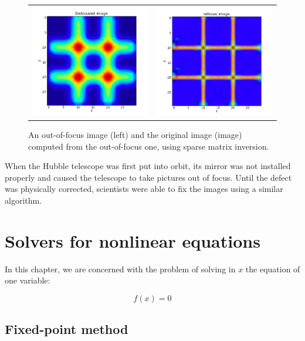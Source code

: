 \documentclass[justified,sixbynine]{tufte-book}
\theoremstyle{plain}%
\theoremstyle{definition}
\theoremstyle{remark}
\begin{document}
\begin{fullwidth}
\begin{figure}[ht]
\centering
\begin{tabular}{cc}
\includegraphics[width=2.2in]{images/defocused.png} &
\includegraphics[width=2.2in]{images/refocused.png}
\end{tabular}
\caption{An out-of-focus image (left) and the original image (image) computed from the out-of-focus one, using sparse matrix inversion.}
\end{figure}

When the Hubble telescope was first put into orbit, its mirror was not installed properly and caused the telescope to take pictures out of focus. Until the defect was physically corrected, scientists were able to fix the images using a similar algorithm.

\goodbreak\section{Solvers for nonlinear equations}


In this chapter, we are concerned with the problem of solving in $x$ the equation of one variable:

\begin{equation}
f(x) = 0
\end{equation}

\goodbreak\subsection{Fixed-point method}


\end{fullwidth}
\end{document}
